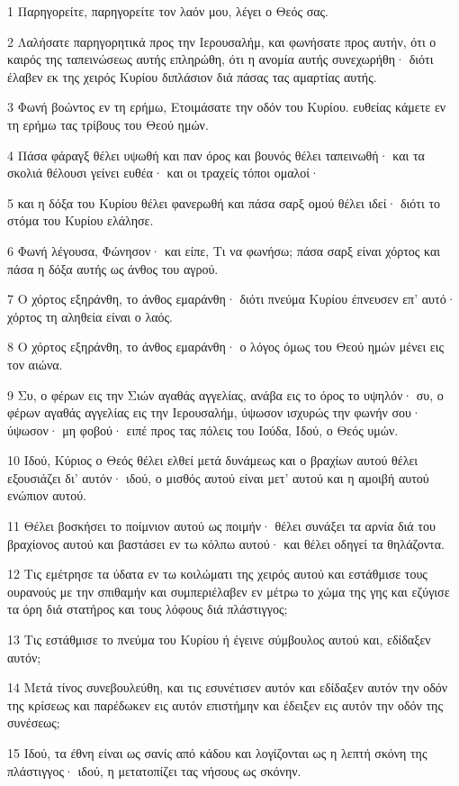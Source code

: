 \par 1 Παρηγορείτε, παρηγορείτε τον λαόν μου, λέγει ο Θεός σας.
\par 2 Λαλήσατε παρηγορητικά προς την Ιερουσαλήμ, και φωνήσατε προς αυτήν, ότι ο καιρός της ταπεινώσεως αυτής επληρώθη, ότι η ανομία αυτής συνεχωρήθη· διότι έλαβεν εκ της χειρός Κυρίου διπλάσιον διά πάσας τας αμαρτίας αυτής.
\par 3 Φωνή βοώντος εν τη ερήμω, Ετοιμάσατε την οδόν του Κυρίου. ευθείας κάμετε εν τη ερήμω τας τρίβους του Θεού ημών.
\par 4 Πάσα φάραγξ θέλει υψωθή και παν όρος και βουνός θέλει ταπεινωθή· και τα σκολιά θέλουσι γείνει ευθέα· και οι τραχείς τόποι ομαλοί·
\par 5 και η δόξα του Κυρίου θέλει φανερωθή και πάσα σαρξ ομού θέλει ιδεί· διότι το στόμα του Κυρίου ελάλησε.
\par 6 Φωνή λέγουσα, Φώνησον· και είπε, Τι να φωνήσω; πάσα σαρξ είναι χόρτος και πάσα η δόξα αυτής ως άνθος του αγρού.
\par 7 Ο χόρτος εξηράνθη, το άνθος εμαράνθη· διότι πνεύμα Κυρίου έπνευσεν επ' αυτό· χόρτος τη αληθεία είναι ο λαός.
\par 8 Ο χόρτος εξηράνθη, το άνθος εμαράνθη· ο λόγος όμως του Θεού ημών μένει εις τον αιώνα.
\par 9 Συ, ο φέρων εις την Σιών αγαθάς αγγελίας, ανάβα εις το όρος το υψηλόν· συ, ο φέρων αγαθάς αγγελίας εις την Ιερουσαλήμ, ύψωσον ισχυρώς την φωνήν σου· ύψωσον· μη φοβού· ειπέ προς τας πόλεις του Ιούδα, Ιδού, ο Θεός υμών.
\par 10 Ιδού, Κύριος ο Θεός θέλει ελθεί μετά δυνάμεως και ο βραχίων αυτού θέλει εξουσιάζει δι' αυτόν· ιδού, ο μισθός αυτού είναι μετ' αυτού και η αμοιβή αυτού ενώπιον αυτού.
\par 11 Θέλει βοσκήσει το ποίμνιον αυτού ως ποιμήν· θέλει συνάξει τα αρνία διά του βραχίονος αυτού και βαστάσει εν τω κόλπω αυτού· και θέλει οδηγεί τα θηλάζοντα.
\par 12 Τις εμέτρησε τα ύδατα εν τω κοιλώματι της χειρός αυτού και εστάθμισε τους ουρανούς με την σπιθαμήν και συμπεριέλαβεν εν μέτρω το χώμα της γης και εζύγισε τα όρη διά στατήρος και τους λόφους διά πλάστιγγος;
\par 13 Τις εστάθμισε το πνεύμα του Κυρίου ή έγεινε σύμβουλος αυτού και, εδίδαξεν αυτόν;
\par 14 Μετά τίνος συνεβουλεύθη, και τις εσυνέτισεν αυτόν και εδίδαξεν αυτόν την οδόν της κρίσεως και παρέδωκεν εις αυτόν επιστήμην και έδειξεν εις αυτόν την οδόν της συνέσεως;
\par 15 Ιδού, τα έθνη είναι ως σανίς από κάδου και λογίζονται ως η λεπτή σκόνη της πλάστιγγος· ιδού, η μετατοπίζει τας νήσους ως σκόνην.
